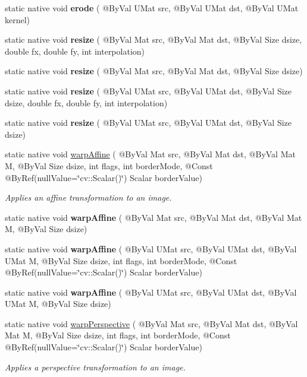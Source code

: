 \begin{DoxyCompactItemize}
\item 
static native void {\bfseries erode} ( @By\+Val U\+Mat src, @By\+Val U\+Mat dst, @By\+Val U\+Mat kernel)
\item 
static native void {\bfseries resize} ( @By\+Val Mat src, @By\+Val Mat dst, @By\+Val Size dsize, double fx, double fy, int interpolation)
\item 
static native void {\bfseries resize} ( @By\+Val Mat src, @By\+Val Mat dst, @By\+Val Size dsize)
\item 
static native void {\bfseries resize} ( @By\+Val U\+Mat src, @By\+Val U\+Mat dst, @By\+Val Size dsize, double fx, double fy, int interpolation)
\item 
static native void {\bfseries resize} ( @By\+Val U\+Mat src, @By\+Val U\+Mat dst, @By\+Val Size dsize)
\item 
static native void \hyperlink{group__imgproc__transform_ga0f7c28988998c3ae473a6708bdeef114}{warp\+Affine} ( @By\+Val Mat src, @By\+Val Mat dst, @By\+Val Mat M, @By\+Val Size dsize, int flags, int border\+Mode, @Const @By\+Ref(null\+Value=\char`\"{}cv\+::\+Scalar()\char`\"{}) Scalar border\+Value)
\begin{DoxyCompactList}\small\item\em Applies an affine transformation to an image. \end{DoxyCompactList}\item 
static native void {\bfseries warp\+Affine} ( @By\+Val Mat src, @By\+Val Mat dst, @By\+Val Mat M, @By\+Val Size dsize)
\item 
static native void {\bfseries warp\+Affine} ( @By\+Val U\+Mat src, @By\+Val U\+Mat dst, @By\+Val U\+Mat M, @By\+Val Size dsize, int flags, int border\+Mode, @Const @By\+Ref(null\+Value=\char`\"{}cv\+::\+Scalar()\char`\"{}) Scalar border\+Value)
\item 
static native void {\bfseries warp\+Affine} ( @By\+Val U\+Mat src, @By\+Val U\+Mat dst, @By\+Val U\+Mat M, @By\+Val Size dsize)
\item 
static native void \hyperlink{group__imgproc__transform_ga75e1d893d7bf652cd99d608259c00c24}{warp\+Perspective} ( @By\+Val Mat src, @By\+Val Mat dst, @By\+Val Mat M, @By\+Val Size dsize, int flags, int border\+Mode, @Const @By\+Ref(null\+Value=\char`\"{}cv\+::\+Scalar()\char`\"{}) Scalar border\+Value)
\begin{DoxyCompactList}\small\item\em Applies a perspective transformation to an image. \end{DoxyCompactList}\item 

\end{DoxyCompactItemize}

